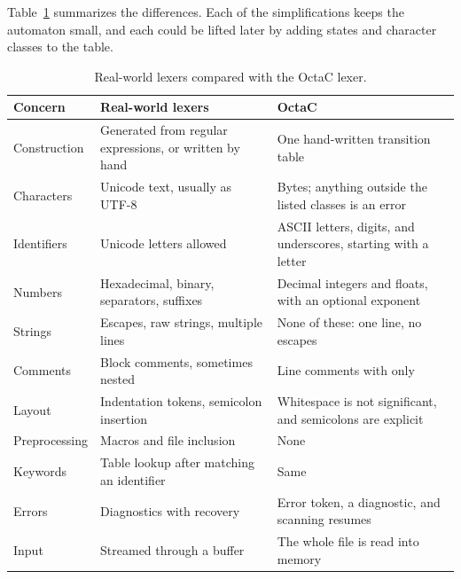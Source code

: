 Table~\ref{tab:lexer-simplifications} summarizes the differences. Each of the
simplifications keeps the automaton small, and each could be lifted later by
adding states and character classes to the table.

\begin{table}[tbp]
\centering
\small
\renewcommand{\arraystretch}{1.15}
\begin{tabular}{@{}>{\raggedright\arraybackslash}p{62pt}>{\raggedright\arraybackslash}p{190pt}>{\raggedright\arraybackslash}p{180pt}@{}}
\toprule
\textbf{Concern} & \textbf{Real-world lexers} & \textbf{OctaC} \\
\midrule
Construction & Generated from regular expressions, or written by hand \cite{flex-manual,clang-internals} & One hand-written transition table \\
Characters & Unicode text, usually as UTF-8 & Bytes; anything outside the listed classes is an error \\
Identifiers & Unicode letters allowed \cite{unicode-uax31} & ASCII letters, digits, and underscores, starting with a letter \\
Numbers & Hexadecimal, binary, separators, suffixes \cite{rust-reference} & Decimal integers and floats, with an optional exponent \\
Strings & Escapes, raw strings, multiple lines \cite{rust-reference} & None of these: one line, no escapes \\
Comments & Block comments, sometimes nested \cite{rust-reference} & Line comments with \code{//} only \\
Layout & Indentation tokens, semicolon insertion \cite{python-reference,go-spec} & Whitespace is not significant, and semicolons are explicit \\
Preprocessing & Macros and file inclusion \cite{gcc-cppinternals} & None \\
Keywords & Table lookup after matching an identifier \cite{flex-manual} & Same \\
Errors & Diagnostics with recovery & Error token, a diagnostic, and scanning resumes \\
Input & Streamed through a buffer & The whole file is read into memory \\
\bottomrule
\end{tabular}
\caption{Real-world lexers compared with the OctaC lexer.}
\label{tab:lexer-simplifications}
\end{table}
